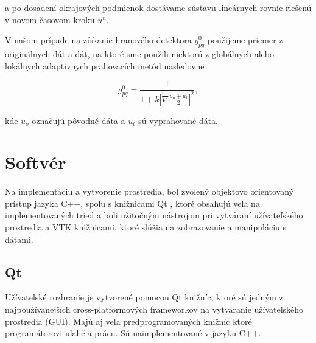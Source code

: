 \documentclass[a4paper,11pt,oneside]{article}%
\begin{document}
a po dosadení okrajových podmienok dostávame sústavu lineárnych rovníc riešenú v novom časovom kroku $u^n$.

V našom prípade na získanie hranového detektora $g_{pq}^{0}$ použijeme priemer z originálnych dát a dát, na ktoré sme použili niektorú z globálnych alebo lokálnych adaptívnych prahovacích metód nasledovne

\begin{equation}
g_{pq}^{0} = \frac{1}{1 + k|\nabla \frac{u_o + u_t}{2}|^2},
\end{equation}

kde $u_o$ označujú pôvodné dáta a $u_t$ sú vyprahované dáta. 

\newpage
\section{Softvér}

Na implementáciu a vytvorenie prostredia, bol zvolený objektovo orientovaný prístup jazyka C++, spolu s knižnicami Qt \cite{qt}, ktoré obsahujú veľa na implementovaných tried a boli užitočným nástrojom pri vytváraní užívateľského prostredia a VTK \cite{vtk} knižnicami, ktoré slúžia na zobrazovanie a manipuláciu s dátami. 

\subsection{Qt}
Užívateľské rozhranie je vytvorené pomocou Qt knižníc, ktoré sú jedným z najpoužívanejších cross-platformových frameworkov na vytváranie užívateľského prostredia (GUI). Majú aj veľa predprogramovaných knižníc ktoré programátorovi uľahčia prácu. Sú naimplementované v jazyku C++. 
\end{document}
